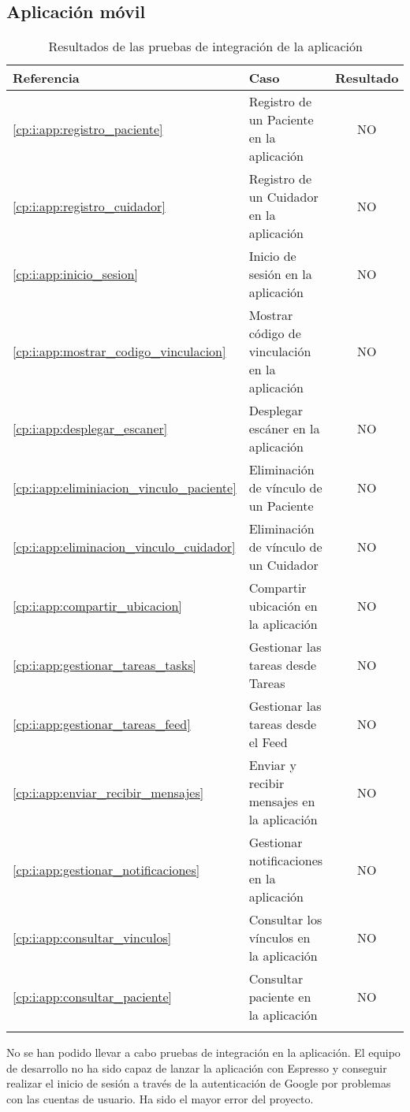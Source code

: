 \subsection{Aplicación móvil}

\begin{longtable}{ l l c }
    \hline
    Referencia & Caso & Resultado \\
    \hline
    \ref{cp:i:app:registro_paciente} & Registro de un Paciente en la aplicación & NO \\
    \ref{cp:i:app:registro_cuidador} & Registro de un Cuidador en la aplicación & NO \\ \hline
    \ref{cp:i:app:inicio_sesion} & Inicio de sesión en la aplicación & NO \\ \hline
    \ref{cp:i:app:mostrar_codigo_vinculacion} & Mostrar código de vinculación en la aplicación & NO \\
    \ref{cp:i:app:desplegar_escaner} & Desplegar escáner en la aplicación & NO \\
    \ref{cp:i:app:eliminiacion_vinculo_paciente} & Eliminación de vínculo de un Paciente & NO \\
    \ref{cp:i:app:eliminacion_vinculo_cuidador} & Eliminación de vínculo de un Cuidador & NO \\ \hline
    \ref{cp:i:app:compartir_ubicacion} & Compartir ubicación en la aplicación & NO \\ \hline
    \ref{cp:i:app:gestionar_tareas_tasks} & Gestionar las tareas desde Tareas & NO \\
    \ref{cp:i:app:gestionar_tareas_feed} & Gestionar las tareas desde el Feed & NO \\ \hline
    \ref{cp:i:app:enviar_recibir_mensajes} & Enviar y recibir mensajes en la aplicación & NO \\ \hline
    \ref{cp:i:app:gestionar_notificaciones} & Gestionar notificaciones en la aplicación & NO \\ \hline
    \ref{cp:i:app:consultar_vinculos} & Consultar los vínculos en la aplicación & NO \\ \hline
    \ref{cp:i:app:consultar_paciente} & Consultar paciente en la aplicación & NO \\ \hline
    \caption{Resultados de las pruebas de integración de la aplicación}
\end{longtable}

No se han podido llevar a cabo pruebas de integración en la aplicación. El equipo de desarrollo no ha sido capaz de lanzar la aplicación con Espresso y conseguir realizar el inicio de sesión a través de la autenticación de Google por problemas con las cuentas de usuario. Ha sido el mayor error del proyecto.